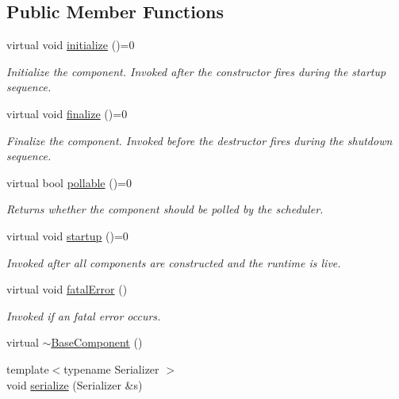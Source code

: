 \subsection*{Public Member Functions}
\begin{DoxyCompactItemize}
\item 
virtual void \hyperlink{structvt_1_1runtime_1_1component_1_1_base_component_ae361291ee8a37325580e59fb4030bc3a}{initialize} ()=0
\begin{DoxyCompactList}\small\item\em Initialize the component. Invoked after the constructor fires during the startup sequence. \end{DoxyCompactList}\item 
virtual void \hyperlink{structvt_1_1runtime_1_1component_1_1_base_component_ac03e2177ad2e26b1b8cb94c7e47e3eff}{finalize} ()=0
\begin{DoxyCompactList}\small\item\em Finalize the component. Invoked before the destructor fires during the shutdown sequence. \end{DoxyCompactList}\item 
virtual bool \hyperlink{structvt_1_1runtime_1_1component_1_1_base_component_ab651a49e6d4d3d8ca9e82a6b4b10af66}{pollable} ()=0
\begin{DoxyCompactList}\small\item\em Returns whether the component should be polled by the scheduler. \end{DoxyCompactList}\item 
virtual void \hyperlink{structvt_1_1runtime_1_1component_1_1_base_component_a8bf92f9f0a7027abf7deaefa2e7f5202}{startup} ()=0
\begin{DoxyCompactList}\small\item\em Invoked after all components are constructed and the runtime is live. \end{DoxyCompactList}\item 
virtual void \hyperlink{structvt_1_1runtime_1_1component_1_1_base_component_a43eeed44aa64c77f5491abb4f5a39e9a}{fatal\+Error} ()
\begin{DoxyCompactList}\small\item\em Invoked if an fatal error occurs. \end{DoxyCompactList}\item 
virtual \hyperlink{structvt_1_1runtime_1_1component_1_1_base_component_a9190b5cb499f9cfdacc1e0bd98a1805a}{$\sim$\+Base\+Component} ()
\item 
{\footnotesize template$<$typename Serializer $>$ }\\void \hyperlink{structvt_1_1runtime_1_1component_1_1_base_component_abe85836f57c42a695fdc292cd78b10cb}{serialize} (Serializer \&s)
\end{DoxyCompactItemize}
